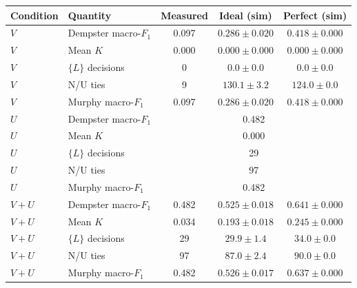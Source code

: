 \begin{tabular}{llccc}
\toprule
Condition & Quantity & Measured & Ideal (sim) & Perfect (sim) \\
\midrule
$V$ & Dempster macro-$F_1$ & 0.097 & $0.286 \pm 0.020$ & $0.418 \pm 0.000$ \\
$V$ & Mean $K$ & 0.000 & $0.000 \pm 0.000$ & $0.000 \pm 0.000$ \\
$V$ & $\{L\}$ decisions & 0 & $0.0 \pm 0.0$ & $0.0 \pm 0.0$ \\
$V$ & N/U ties & 9 & $130.1 \pm 3.2$ & $124.0 \pm 0.0$ \\
$V$ & Murphy macro-$F_1$ & 0.097 & $0.286 \pm 0.020$ & $0.418 \pm 0.000$ \\
\midrule
$U$ & Dempster macro-$F_1$ & \multicolumn{3}{c}{0.482} \\
$U$ & Mean $K$ & \multicolumn{3}{c}{0.000} \\
$U$ & $\{L\}$ decisions & \multicolumn{3}{c}{29} \\
$U$ & N/U ties & \multicolumn{3}{c}{97} \\
$U$ & Murphy macro-$F_1$ & \multicolumn{3}{c}{0.482} \\
\midrule
$V{+}U$ & Dempster macro-$F_1$ & 0.482 & $0.525 \pm 0.018$ & $0.641 \pm 0.000$ \\
$V{+}U$ & Mean $K$ & 0.034 & $0.193 \pm 0.018$ & $0.245 \pm 0.000$ \\
$V{+}U$ & $\{L\}$ decisions & 29 & $29.9 \pm 1.4$ & $34.0 \pm 0.0$ \\
$V{+}U$ & N/U ties & 97 & $87.0 \pm 2.4$ & $90.0 \pm 0.0$ \\
$V{+}U$ & Murphy macro-$F_1$ & 0.482 & $0.526 \pm 0.017$ & $0.637 \pm 0.000$ \\
\bottomrule
\end{tabular}
